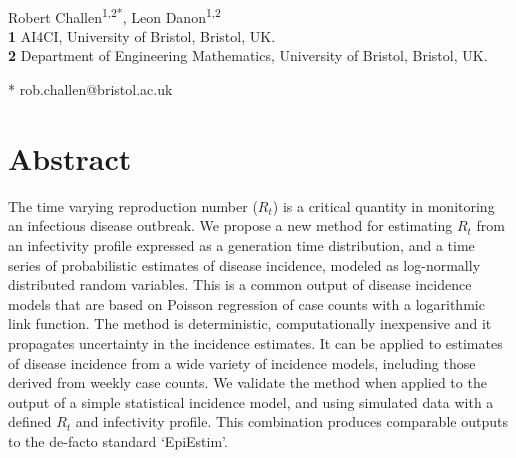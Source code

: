 \documentclass[10pt,letterpaper]{article}
\begin{document}
\vspace*{0.2in}

\begin{flushleft}
{\Large
\textbf{}
}
\newline
\\
Robert Challen\textsuperscript{1,2*},
Leon Danon\textsuperscript{1,2}
\\
\bigskip
\textbf{1} AI4CI, University of Bristol, Bristol, UK.\\
\textbf{2} Department of Engineering Mathematics, University of Bristol, Bristol, UK.\\
\bigskip

* rob.challen@bristol.ac.uk

\end{flushleft}
\section*{Abstract}

The time varying reproduction number ($R_t$) is a critical quantity in monitoring an infectious disease outbreak. We propose a new method for estimating $R_t$ from an infectivity profile expressed as a generation time distribution, and a time series of probabilistic estimates of disease incidence, modeled as log-normally distributed random variables. This is a common output of disease incidence models that are based on Poisson regression of case counts with a logarithmic link function. The method is deterministic, computationally inexpensive and it propagates uncertainty in the incidence estimates. It can be applied to estimates of disease incidence from a wide variety of incidence models, including those derived from weekly case counts. We validate the method when applied to the output of a simple statistical incidence model, and using simulated data with a defined $R_t$ and infectivity profile. This combination produces comparable outputs to the de-facto standard `EpiEstim'.

\end{document}

